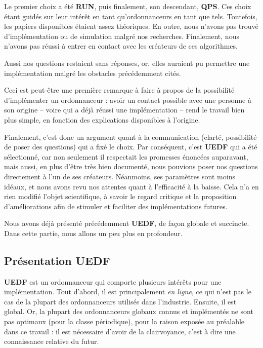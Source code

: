 	Le premier choix a été \textbf{RUN}, puis finalement, son descendant, \textbf{QPS}. Ces choix étant guidés 
	sur leur intérêt en tant qu'ordonnanceurs en tant que tels.
	Toutefois, les papiers disponibles étaient assez théoriques. En outre, nous n'avons pas 
	trouvé d'implémentation ou de simulation malgré nos recherches.
	Finalement, nous n'avons pas réussi à entrer en contact avec les créateurs de ces algorithmes. 
	
	Aussi nos questions restaient sans réponses, or, elles auraient pu permettre une implémentation 
	malgré les obstacles précédemment cités.\newline
	
	Ceci est peut-être une première remarque à faire à propos de la possibilité d'implémenter 
	un ordonnanceur : avoir un contact possible avec une personne à son origine -- voire qui a déjà 
	réussi une implémentation -- rend le travail bien plus simple, en fonction des 
	explications disponibles à l'origine.\newline
	
	
	Finalement, c'est donc un argument quant à la communication (clarté, possibilité de poser des questions) 
	qui a fixé le choix. Par conséquent, c'est \textbf{UEDF} qui a été sélectionné, car 
	non seulement il respectait 
	les promesses énoncées auparavant, mais aussi, en plus d'être très bien documenté, 
	 nous pouvions poser nos questions directement à l'un de ses créateurs. Néanmoins, ses paramètres sont moins idéaux, 
	et nous avons revu nos attentes quant à l'efficacité à la baisse. Cela n'a en rien 
	modifié l'objet scientifique, à savoir le regard critique et la proposition d'améliorations 
	afin de stimuler et faciliter des implémentations futures.\newline
	
	
	Nous avons déjà présenté précédemment \textbf{UEDF}, de façon globale et succincte. 
	Dans cette partie, nous allons un peu plus en profondeur.
	
	
	\subsection{Présentation UEDF}
	\textbf{UEDF} est un ordonnanceur qui comporte plusieurs intérêts pour une implémentation.
	Tout d'abord, il est principalement \textit{en ligne}, ce qui n'est pas le cas de 
	la plupart des ordonnanceurs utilisés dans l'industrie.
	Ensuite, il est global. Or, la plupart des ordonnanceurs 
	globaux connus et implémentés ne sont pas optimaux (pour la classe périodique), pour la
	raison exposée au préalable dans ce travail : il est nécessaire d'avoir de la clairvoyance, 
	c'est à dire une connaissance relative du futur.\newline
	
